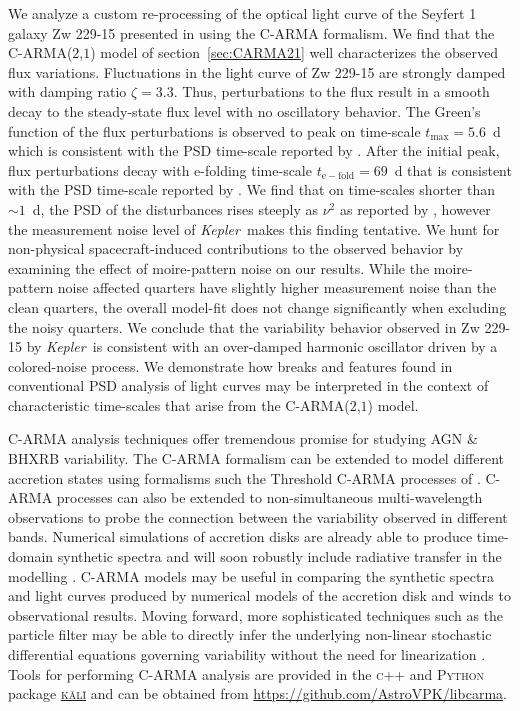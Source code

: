 \documentclass[a4paper,fleqn,usenatbib]{mnras}
\newcommand{\Kepler}{\textit{Kepler~}}
\begin{document}
We analyze a custom re-processing of the optical light curve of the Seyfert 1 galaxy Zw 229-15 presented in \citet{CariniWilliamsAAS} using the C-ARMA formalism. We find that the C-ARMA($2$,$1$) model of section~\ref{sec:CARMA21} well characterizes the observed flux variations. Fluctuations in the light curve of Zw 229-15 are strongly damped with damping ratio $\zeta = 3.3$. Thus, perturbations to the flux result in a smooth decay to the steady-state flux level with no oscillatory behavior. The Green's function of the flux perturbations is observed to peak on time-scale $t_{\mathrm{max}} = 5.6$~d which is consistent with the PSD time-scale reported by \citet{Edelson14}. After the initial peak, flux perturbations decay with e-folding time-scale $t_{\mathrm{e-fold}} = 69$~d that is consistent with the PSD time-scale reported by \citet{CariniWilliamsAAS}. We find that on time-scales shorter than $\sim 1$~d, the PSD of the disturbances rises steeply as $\nu^{2}$ as reported by \citet{Edelson14}, however the measurement noise level of \Kepler makes this finding tentative. We hunt for non-physical spacecraft-induced contributions to the observed behavior by examining the effect of moire-pattern noise on our results. While the moire-pattern noise affected quarters have slightly higher measurement noise than the clean quarters, the overall model-fit does not change significantly when excluding the noisy quarters. We conclude that the variability behavior observed in Zw 229-15 by \Kepler is consistent with an over-damped harmonic oscillator driven by a colored-noise process. We demonstrate how breaks and features found in conventional PSD analysis of light curves may be interpreted in the context of characteristic time-scales that arise from the C-ARMA($2$,$1$) model.

C-ARMA analysis techniques offer tremendous promise for studying AGN \& BHXRB variability. The C-ARMA formalism can be extended to model different accretion states using formalisms such the Threshold C-ARMA processes of \citet{DimensionEstimationBrockwell}. C-ARMA processes can also be extended to non-simultaneous multi-wavelength observations to probe the connection between the variability observed in different bands. Numerical simulations of accretion disks are already able to produce time-domain synthetic spectra \citep{Schnittman13b} and will soon robustly include radiative transfer in the modelling \citep{FragileAccretion}. C-ARMA models may be useful in comparing the synthetic spectra and light curves produced by numerical models of the accretion disk and winds to observational results. Moving forward, more sophisticated techniques such as the particle filter may be able to directly infer the underlying non-linear stochastic differential equations governing variability without the need for linearization \citep{Hanif15}. Tools for performing C-ARMA analysis are provided in the \textsc{c++} and \textsc{Python} package \href{https://github.com/AstroVPK/kali}{\textsc{k\={a}l\={i}}} and can be obtained from \url{https://github.com/AstroVPK/libcarma}.
\end{document}
